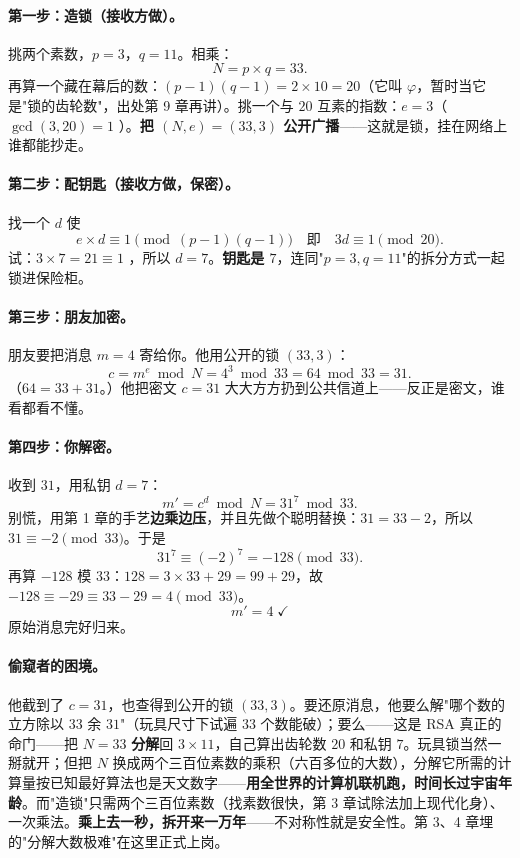 \paragraph{第一步：造锁（接收方做）。}挑两个素数，$p = 3$，$q = 11$。相乘：
\[
N = p\times q = 33 .
\]
再算一个藏在幕后的数：$(p-1)(q-1) = 2\times10 = 20$（它叫 $\varphi$，暂时当它是"锁的齿轮数"，出处第 9 章再讲）。挑一个与 $20$ 互素的指数：$e = 3$（$\gcd(3,20)=1$ \checkmark）。\textbf{把 $(N, e) = (33, 3)$ 公开广播}——这就是锁，挂在网络上谁都能抄走。

\paragraph{第二步：配钥匙（接收方做，保密）。}找一个 $d$ 使
\[
e\times d \equiv 1 \pmod{(p-1)(q-1)} \quad\text{即}\quad 3d \equiv 1 \pmod{20}.
\]
试：$3\times7 = 21 \equiv 1$ \checkmark，所以 $d = 7$。\textbf{钥匙是 $7$}，连同"$p=3, q=11$"的拆分方式一起锁进保险柜。

\paragraph{第三步：朋友加密。}朋友要把消息 $m = 4$ 寄给你。他用公开的锁 $(33, 3)$：
\[
c = m^e \bmod N = 4^3 \bmod 33 = 64 \bmod 33 = 31 .
\]
（$64 = 33 + 31$。）他把密文 $c = 31$ 大大方方扔到公共信道上——反正是密文，谁看都看不懂。

\paragraph{第四步：你解密。}收到 $31$，用私钥 $d = 7$：
\[
m' = c^d \bmod N = 31^7 \bmod 33 .
\]
别慌，用第 1 章的手艺\textbf{边乘边压}，并且先做个聪明替换：$31 = 33 - 2$，所以 $31 \equiv -2 \pmod{33}$。于是
\[
31^7 \equiv (-2)^7 = -128 \pmod{33}.
\]
再算 $-128$ 模 $33$：$128 = 3\times33 + 29 = 99 + 29$，故 $-128 \equiv -29 \equiv 33 - 29 = 4 \pmod{33}$。
\[
m' = 4 \;\checkmark
\]
原始消息完好归来。

\paragraph{偷窥者的困境。}他截到了 $c = 31$，也查得到公开的锁 $(33, 3)$。要还原消息，他要么解"哪个数的立方除以 $33$ 余 $31$"（玩具尺寸下试遍 $33$ 个数能破）；要么——这是 RSA 真正的命门——把 $N = 33$ \textbf{分解}回 $3\times11$，自己算出齿轮数 $20$ 和私钥 $7$。玩具锁当然一掰就开；但把 $N$ 换成两个三百位素数的乘积（六百多位的大数），分解它所需的计算量按已知最好算法也是天文数字——\textbf{用全世界的计算机联机跑，时间长过宇宙年龄}。而"造锁"只需两个三百位素数（找素数很快，第 3 章试除法加上现代化身）、一次乘法。\textbf{乘上去一秒，拆开来一万年}——不对称性就是安全性。第 3、4 章埋的"分解大数极难"在这里正式上岗。

